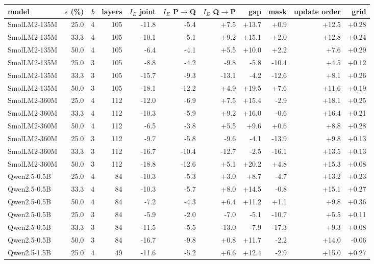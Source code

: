 \documentclass{article}
\begin{document}
\begin{longtable}{lrrrrrrrrrr}
\toprule model & $s$ (\%) & $b$ & layers & $I_E$ joint & $I_E$ P$\to$Q & $I_E$ Q$\to$P & gap & mask & update order & grid \\ \midrule \endhead
SmolLM2-135M & 25.0 & 4 & 105 & -11.8 & -5.4 & +7.5 & +13.7 & +0.9 & +12.5 & +0.28 \\
SmolLM2-135M & 33.3 & 4 & 105 & -10.1 & -5.1 & +9.2 & +15.1 & +2.0 & +12.8 & +0.24 \\
SmolLM2-135M & 50.0 & 4 & 105 & -6.4 & -4.1 & +5.5 & +10.0 & +2.2 & +7.6 & +0.29 \\
SmolLM2-135M & 25.0 & 3 & 105 & -8.8 & -4.2 & -9.8 & -5.8 & -10.4 & +4.5 & +0.12 \\
SmolLM2-135M & 33.3 & 3 & 105 & -15.7 & -9.3 & -13.1 & -4.2 & -12.6 & +8.1 & +0.26 \\
SmolLM2-135M & 50.0 & 3 & 105 & -18.1 & -12.2 & +4.9 & +19.5 & +7.6 & +11.6 & +0.19 \\
SmolLM2-360M & 25.0 & 4 & 112 & -12.0 & -6.9 & +7.5 & +15.4 & -2.9 & +18.1 & +0.25 \\
SmolLM2-360M & 33.3 & 4 & 112 & -10.3 & -5.9 & +9.2 & +16.0 & -0.6 & +16.4 & +0.21 \\
SmolLM2-360M & 50.0 & 4 & 112 & -6.5 & -3.8 & +5.5 & +9.6 & +0.6 & +8.8 & +0.28 \\
SmolLM2-360M & 25.0 & 3 & 112 & -9.7 & -5.8 & -9.6 & -4.1 & -13.9 & +9.8 & +0.13 \\
SmolLM2-360M & 33.3 & 3 & 112 & -16.7 & -10.4 & -12.7 & -2.5 & -16.1 & +13.5 & +0.13 \\
SmolLM2-360M & 50.0 & 3 & 112 & -18.8 & -12.6 & +5.1 & +20.2 & +4.8 & +15.3 & +0.08 \\
Qwen2.5-0.5B & 25.0 & 4 & 84 & -10.3 & -5.3 & +3.0 & +8.7 & -4.7 & +13.2 & +0.23 \\
Qwen2.5-0.5B & 33.3 & 4 & 84 & -10.3 & -5.7 & +8.0 & +14.5 & -0.8 & +15.1 & +0.27 \\
Qwen2.5-0.5B & 50.0 & 4 & 84 & -7.2 & -4.3 & +6.4 & +11.2 & +1.1 & +9.8 & +0.36 \\
Qwen2.5-0.5B & 25.0 & 3 & 84 & -5.9 & -2.0 & -7.0 & -5.1 & -10.7 & +5.5 & +0.11 \\
Qwen2.5-0.5B & 33.3 & 3 & 84 & -11.5 & -5.5 & -13.0 & -7.9 & -17.3 & +9.3 & +0.08 \\
Qwen2.5-0.5B & 50.0 & 3 & 84 & -16.7 & -9.8 & +0.8 & +11.7 & -2.2 & +14.0 & -0.06 \\
Qwen2.5-1.5B & 25.0 & 4 & 49 & -11.6 & -5.2 & +6.6 & +12.4 & -2.9 & +15.0 & +0.27 \\

\end{longtable}
\end{document}
